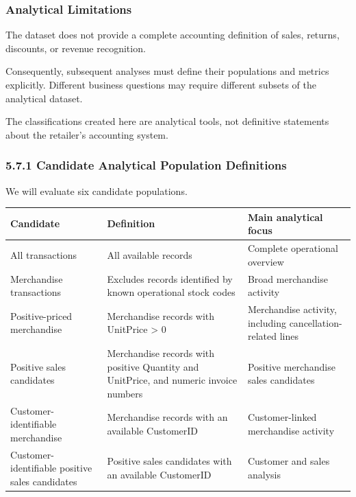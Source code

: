 \documentclass[11pt]{article}
\begin{document}
\subsubsection{Analytical Limitations}\label{analytical-limitations}

The dataset does not provide a complete accounting definition of sales,
returns, discounts, or revenue recognition.

Consequently, subsequent analyses must define their populations and
metrics explicitly. Different business questions may require different
subsets of the analytical dataset.

The classifications created here are analytical tools, not definitive
statements about the retailer's accounting system.

    \subsubsection{5.7.1 Candidate Analytical Population
Definitions}\label{candidate-analytical-population-definitions}

We will evaluate six candidate populations.

{\def\LTcaptype{none} %
\begin{longtable}[]{@{}
  >{\raggedright\arraybackslash}p{}
  >{\raggedright\arraybackslash}p{}
  >{\raggedright\arraybackslash}p{}@{}}
\toprule\noalign{}
\begin{minipage}[b]{\linewidth}\raggedright
Candidate
\end{minipage} & \begin{minipage}[b]{\linewidth}\raggedright
Definition
\end{minipage} & \begin{minipage}[b]{\linewidth}\raggedright
Main analytical focus
\end{minipage} \\
\midrule\noalign{}
\endhead
\bottomrule\noalign{}
\endlastfoot
All transactions & All available records & Complete operational
overview \\
Merchandise transactions & Excludes records identified by known
operational stock codes & Broad merchandise activity \\
Positive-priced merchandise & Merchandise records with UnitPrice
\textgreater{} 0 & Merchandise activity, including cancellation-related
lines \\
Positive sales candidates & Merchandise records with positive Quantity
and UnitPrice, and numeric invoice numbers & Positive merchandise sales
candidates \\
Customer-identifiable merchandise & Merchandise records with an
available CustomerID & Customer-linked merchandise activity \\
Customer-identifiable positive sales candidates & Positive sales
candidates with an available CustomerID & Customer and sales analysis \\
\end{longtable}
}
\end{document}
